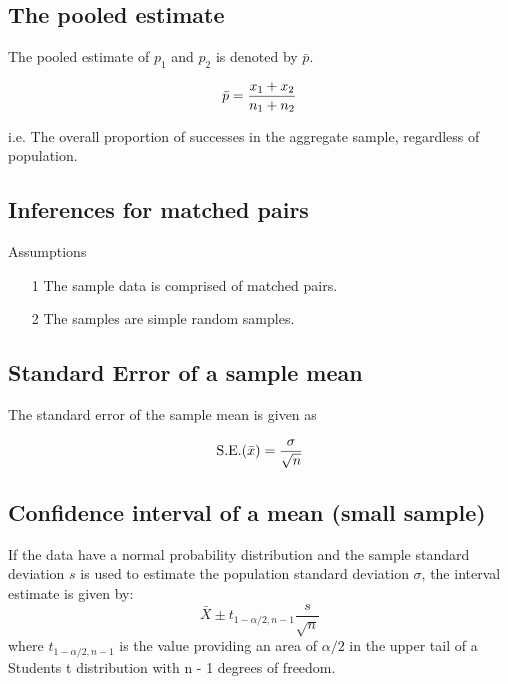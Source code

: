 \documentclass[]{report}
\begin{document}
{{\subsection{The pooled estimate}

The pooled estimate of $p_1$ and $p_2$ is denoted by $\bar{p}$.

\[ \bar{p} = { x_1 +  x_2  \over n_1 + n_2 } \]

i.e. The overall proportion of successes in the aggregate sample, regardless of population.


\subsection{Inferences for matched pairs}
Assumptions
\begin{itemize}
\item[1] The sample data is comprised of matched pairs.
\item[2] The samples are simple random samples.
\end{itemize}


{
\subsection{Standard Error of a sample mean}

The standard error of the sample mean is given as

\[  \mbox{S.E.}(\bar{x}) = { \sigma \over \sqrt{n} } \]

}








\subsection{Confidence interval of a mean (small sample)}

If the data have a normal probability distribution and the sample
standard deviation $s$ is used to estimate the population
standard deviation $\sigma$, the interval estimate is given by:
\begin{equation}
\bar{X} \pm t_{1-\alpha/2,n-1}\frac{s}{\sqrt{n}}
\end{equation}
where $t_{1-\alpha/2,n-1}$ is the value providing an area of $\alpha/2$ in the upper tail of a Students t distribution with n - 1 degrees of freedom.





}}
\end{document}
